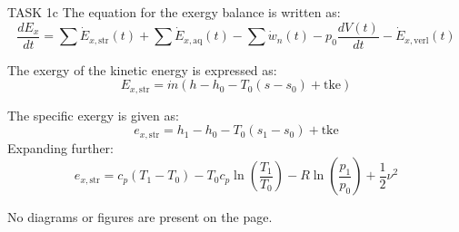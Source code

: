 TASK 1c  
The equation for the exergy balance is written as:  
\[
\frac{dE_x}{dt} = \sum \dot{E}_{x,\text{str}}(t) + \sum \dot{E}_{x,\text{aq}}(t) - \sum \dot{w}_n(t) - p_0 \frac{dV(t)}{dt} - \dot{E}_{x,\text{verl}}(t)
\]  

The exergy of the kinetic energy is expressed as:  
\[
E_{x,\text{str}} = \dot{m} \left( h - h_0 - T_0 (s - s_0) + \text{tke} \right)
\]  

The specific exergy is given as:  
\[
e_{x,\text{str}} = h_1 - h_0 - T_0 (s_1 - s_0) + \text{tke}
\]  
Expanding further:  
\[
e_{x,\text{str}} = c_p (T_1 - T_0) - T_0 c_p \ln \left( \frac{T_1}{T_0} \right) - R \ln \left( \frac{p_1}{p_0} \right) + \frac{1}{2} \nu^2
\]  

No diagrams or figures are present on the page.